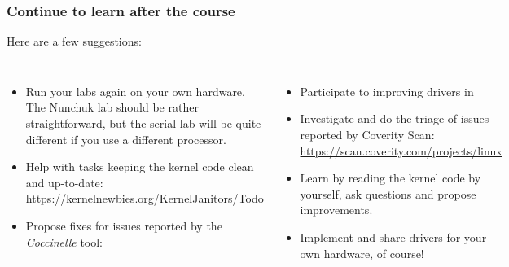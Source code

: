 \begin{frame}
  \frametitle{Continue to learn after the course}
  Here are a few suggestions:
  \begin{columns}
  \begin{itemize}
  \item Run your labs again on your own hardware. The Nunchuk lab should
        be rather straightforward, but the serial lab will be quite different
	if you use a different processor.
  \item Help with tasks keeping the kernel code clean and up-to-date:\\
	\url{https://kernelnewbies.org/KernelJanitors/Todo}
  \item Propose fixes for issues reported by the {\em Coccinelle} tool:\\
  \end{itemize}
  \begin{itemize}
  \item Participate to improving drivers in 
  \item Investigate and do the triage of issues reported by Coverity Scan:
        \url{https://scan.coverity.com/projects/linux}
  \item Learn by reading the kernel code by yourself, ask questions and
	propose improvements.
  \item Implement and share drivers for your own hardware, of course!
  \end{itemize}
  \end{columns}
\end{frame}

